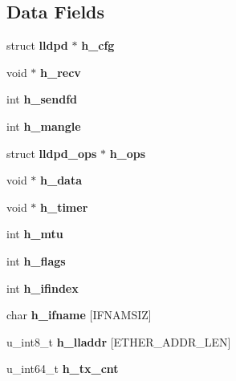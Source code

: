 \subsection*{\-Data \-Fields}
\begin{DoxyCompactItemize}
\item 
struct {\bf lldpd} $\ast$ {\bfseries h\-\_\-cfg}\label{structlldpd__hardware_a0e8b426569e781e69220bac2dc5a4ae4}

\item 
void $\ast$ {\bfseries h\-\_\-recv}\label{structlldpd__hardware_a3642cd866099e30adde5d74fe36d1b28}

\item 
int {\bfseries h\-\_\-sendfd}\label{structlldpd__hardware_ad57b07c4d5035d7368afb20879ae894b}

\item 
int {\bfseries h\-\_\-mangle}\label{structlldpd__hardware_a6426df580406fbd0803d1b8ff9ad6449}

\item 
struct {\bf lldpd\-\_\-ops} $\ast$ {\bfseries h\-\_\-ops}\label{structlldpd__hardware_a63a0a839d411ebea31bd0c7fafe7590e}

\item 
void $\ast$ {\bfseries h\-\_\-data}\label{structlldpd__hardware_a624dc7954640756e5d4924b642e36060}

\item 
void $\ast$ {\bfseries h\-\_\-timer}\label{structlldpd__hardware_a37130ab88b32394ee4556897d3ade15c}

\item 
int {\bfseries h\-\_\-mtu}\label{structlldpd__hardware_a3a35922fcd2d489a0da919f7532d71a8}

\item 
int {\bfseries h\-\_\-flags}\label{structlldpd__hardware_a725efa560618ad4bee87508f397c23fe}

\item 
int {\bfseries h\-\_\-ifindex}\label{structlldpd__hardware_ad91ebd21833ca2ccf0ecc86a2c8f371d}

\item 
char {\bfseries h\-\_\-ifname} [\-I\-F\-N\-A\-M\-S\-I\-Z]\label{structlldpd__hardware_a66f4639811a189d1761366489144b22a}

\item 
u\-\_\-int8\-\_\-t {\bfseries h\-\_\-lladdr} [\-E\-T\-H\-E\-R\-\_\-\-A\-D\-D\-R\-\_\-\-L\-E\-N]\label{structlldpd__hardware_ad8a82e2d287b4995e85ca0c3724838ad}

\item 
u\-\_\-int64\-\_\-t {\bfseries h\-\_\-tx\-\_\-cnt}\label{structlldpd__hardware_adeb6eceaf1a627550c0b989523469e84}


\end{DoxyCompactItemize}
